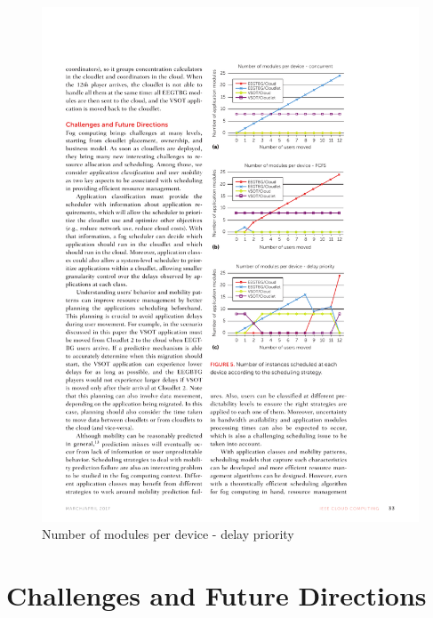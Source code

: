 \documentclass[10pt, pdf, xcolor=pdftex, dvipsnames, table]{beamer}
\begin{document}
\begin{frame}
 	\begin{figure}[htbp]
 		\centerline{\includegraphics[scale=1.2]{images/5c.pdf}}
 		\caption[Number of modules per device - delay priority]{Number of modules per device - delay priority}
 	\end{figure}
\end{frame}

\section[Challenges and Future Directions]{Challenges and Future Directions}

\begin{frame}
	\tableofcontents[currentsection]
\end{frame}
\end{document}

